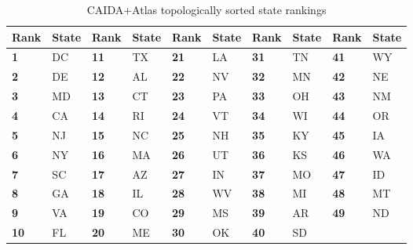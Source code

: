 \begin{table}
    \centering
    \begin{tabular}{ll|ll|ll|ll|ll}
        \textbf{Rank} & \textbf{State} & \textbf{Rank} & \textbf{State} & \textbf{Rank} & \textbf{State} & \textbf{Rank} & \textbf{State} & \textbf{Rank} & \textbf{State} \\
        \hline
        \textbf{1 } & DC & \textbf{11} & TX & \textbf{21} &  LA & \textbf{31} & TN & \textbf{41} &    WY \\
        \textbf{2 } & DE & \textbf{12} & AL & \textbf{22} &  NV & \textbf{32} & MN & \textbf{42} &    NE \\
        \textbf{3 } & MD & \textbf{13} & CT & \textbf{23} &  PA & \textbf{33} & OH & \textbf{43} &    NM \\
        \textbf{4 } & CA & \textbf{14} & RI & \textbf{24} &  VT & \textbf{34} & WI & \textbf{44} &    OR \\
        \textbf{5 } & NJ & \textbf{15} & NC & \textbf{25} &  NH & \textbf{35} & KY & \textbf{45} &    IA \\
        \textbf{6 } & NY & \textbf{16} & MA & \textbf{26} &  UT & \textbf{36} & KS & \textbf{46} &    WA \\
        \textbf{7 } & SC & \textbf{17} & AZ & \textbf{27} &  IN & \textbf{37} & MO & \textbf{47} &    ID \\
        \textbf{8 } & GA & \textbf{18} & IL & \textbf{28} &  WV & \textbf{38} & MI & \textbf{48} &    MT \\
        \textbf{9 } & VA & \textbf{19} & CO & \textbf{29} &  MS & \textbf{39} & AR & \textbf{49} &    ND \\
        \textbf{10} & FL & \textbf{20} & ME & \textbf{30} &  OK & \textbf{40} & SD &             &       \\
    \end{tabular}
    \caption{CAIDA+Atlas topologically sorted state rankings}
    \label{tab:caida_topological_state_rankings}
\end{table}